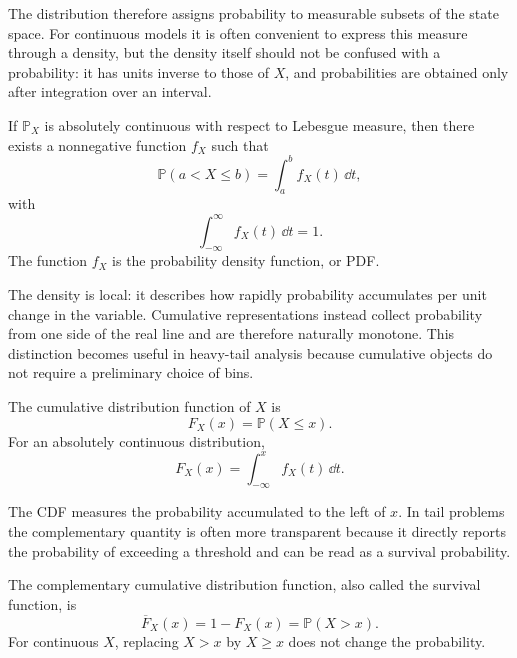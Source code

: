 The distribution therefore assigns probability to measurable subsets of the state space. For continuous models it is often convenient to express this measure through a density, but the density itself should not be confused with a probability: it has units inverse to those of $X$, and probabilities are obtained only after integration over an interval.

\begin{definition}
If $\mathbb{P}_X$ is absolutely continuous with respect to Lebesgue measure, then there exists a nonnegative function $f_X$ such that
\begin{equation}
 \mathbb{P}(a<X\leq b)=\int_a^b f_X(t)\,\dd t,
\end{equation}
with
\begin{equation}
 \int_{-\infty}^{\infty} f_X(t)\,\dd t=1.
\end{equation}
The function $f_X$ is the probability density function, or PDF.
\end{definition}

The density is local: it describes how rapidly probability accumulates per unit change in the variable. Cumulative representations instead collect probability from one side of the real line and are therefore naturally monotone. This distinction becomes useful in heavy-tail analysis because cumulative objects do not require a preliminary choice of bins.

\begin{definition}
The cumulative distribution function of $X$ is
\begin{equation}
 F_X(x)=\mathbb{P}(X\leq x).
\end{equation}
For an absolutely continuous distribution,
\begin{equation}
 F_X(x)=\int_{-\infty}^{x}f_X(t)\,\dd t.
\end{equation}
\end{definition}

The CDF measures the probability accumulated to the left of $x$. In tail problems the complementary quantity is often more transparent because it directly reports the probability of exceeding a threshold and can be read as a survival probability.

\begin{definition}
The complementary cumulative distribution function, also called the survival function, is
\begin{equation}
 \overline F_X(x)=1-F_X(x)=\mathbb{P}(X>x).
\label{eq:ccdf-general}
\end{equation}
For continuous $X$, replacing $X>x$ by $X\geq x$ does not change the probability.
\end{definition}

